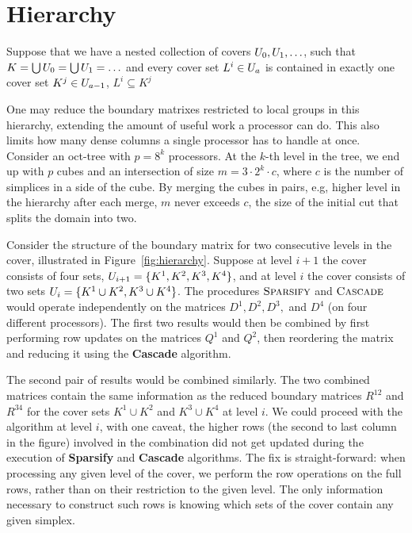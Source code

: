 \section{Hierarchy}
\label{sec:hierarchy}
Suppose that we have a nested collection of
covers $U_0, U_1, \ldots$, such that $K = \bigcup U_0 = \bigcup U_1 = \ldots$
and every cover set $L^i \in U_a$ is contained in exactly one cover set
$K^j \in U_{a-1}$, $L^i \subseteq K^j$

One may reduce the boundary matrixes restricted to local groups in this hierarchy,
extending the amount of useful work a processor can do. This also limits how
many dense columns a single processor has to handle at once.
%
Consider an oct-tree with $p = 8^k$ processors. At the $k$-th level in the
tree, we end up with $p$ cubes and an intersection of size $m = 3 \cdot 2^k \cdot c$,
where $c$ is the number of simplices in a side of the cube. By merging the cubes in pairs, e.g,  higher level
in the hierarchy after each merge, $m$ never exceeds $c$, the size of the
initial cut that splits the domain into two.

Consider the structure of the boundary matrix for two consecutive levels in the
cover, illustrated in Figure~\ref{fig:hierarchy}. Suppose at level $i+1$ the
cover consists of four sets, $U_{i+1} = \{ K^1, K^2, K^3, K^4 \}$, and at level
$i$ the cover consists of two sets $U_i = \{ K^1 \cup K^2, K^3 \cup K^4 \}$.
%
The procedures $\textnormal{\scshape Sparsify}$ and $\textnormal{\scshape Cascade}$ would operate independently
on the matrices $D^1, D^2, D^3,$ and $D^4$ (on four different processors). The first
two results would then be combined by first performing row updates on the matrices $Q^1$ and
$Q^2$, then reordering the matrix and reducing it using the {\bf Cascade}
algorithm.

The second pair of results would be combined similarly.
The two combined matrices contain the same information as the reduced boundary
matrices $R^{12}$ and $R^{34}$ for the cover sets $K^1 \cup K^2$
and $K^3 \cup K^4$ at level $i$. We could proceed with the algorithm at level
$i$, with one caveat, the higher rows (the second to last column in the figure)
involved in the combination did not get updated during the execution of {\bf
Sparsify} and {\bf Cascade} algorithms. The fix is straight-forward: when
processing any given level of the cover, we perform the row operations on the
full rows, rather than on their restriction to the given level.
The only information necessary to construct such rows is knowing which sets of
the cover contain any given simplex.

